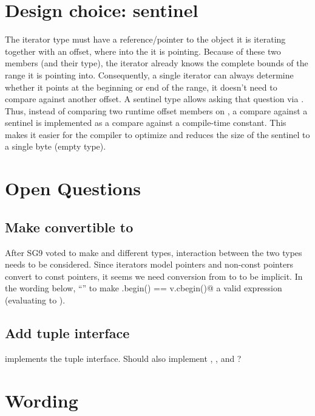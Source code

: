 \section{Design choice: sentinel}

The \simd iterator type must have a reference/pointer to the \simd object it is iterating together
with an offset, where into the \simd it is pointing.
Because of these two members (and their type), the iterator already knows the complete bounds of the
range it is pointing into.
Consequently, a single \simd iterator can always determine whether it points at the beginning or end
of the range, it doesn't need to compare against another offset.
A sentinel type allows asking that question via .
Thus, instead of comparing two runtime offset members on , a compare against a
sentinel is implemented as a compare against a compile-time constant.
This makes it easier for the compiler to optimize and reduces the size of the  sentinel
to a single byte (empty type).


\section{Open Questions}

\subsection{Make  convertible to }
After SG9 voted to make  and  different
types, interaction between the two types needs to be considered.
Since iterators model pointers and non-const pointers convert to const pointers, it seems we need
conversion from  to  to be implicit.
In the wording below, “” to make
\lstinline@v.begin() == v.cbegin()@ a valid expression (evaluating to ).

\subsection{Add tuple interface}

 implements the tuple interface.
Should  also implement , , and ?

\section{Wording}

